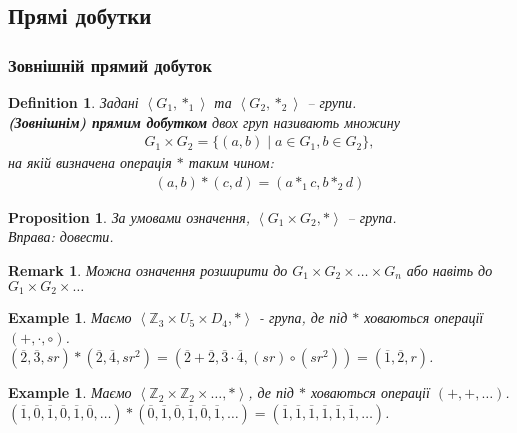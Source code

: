 \documentclass[a4paper, 10pt]{article}
\theoremstyle{theoremdd}
\theoremstyle{theoremdd}
\newtheorem{definition}[theorem]{Definition}
\theoremstyle{theoremdd}
\theoremstyle{theoremdd}
\theoremstyle{theoremdd}
\newtheorem{example}[theorem]{Example}
\theoremstyle{theoremdd}
\theoremstyle{theoremdd}
\theoremstyle{theoremdd}
\theoremstyle{theoremdd}
\newtheorem{proposition}[theorem]{Proposition}
\theoremstyle{theoremdd}
\theoremstyle{theoremdd}
\newtheorem{remark}[theorem]{Remark}
\theoremstyle{theoremdd}
\theoremstyle{theoremdd}
\theoremstyle{theoremdd}
\theoremstyle{theoremdd}
\begin{document}
\subsection{Прямі добутки}
\subsubsection{Зовнішній прямий добуток}
\begin{definition}
Задані $\left<G_1, *_1 \right>$ та $\left<G_2, *_2 \right>$ -- групи.\\
\textbf{(Зовнішнім) прямим добутком} двох груп називають множину
\begin{align*}
G_1 \times G_2 = \{(a,b) \mid a \in G_1, b \in G_2\},
\end{align*}
на якій визначена операція $*$ таким чином:
\begin{align*}
(a,b) * (c,d) = (a *_1 c, b*_2 d)
\end{align*}
\end{definition}

\begin{proposition}
За умовами означення, $\left< G_1 \times G_2, * \right>$ -- група.\\
\textit{Вправа: довести.}
\end{proposition}

\begin{remark}
Можна означення розширити до $G_1 \times G_2 \times \dots \times G_n$ або навіть до $G_1 \times G_2 \times \dots$
\end{remark}

\begin{example}
Маємо $\left< \mathbb{Z}_3 \times U_5 \times D_4, * \right>$ - група, де під $*$ ховаються операції $(+,\cdot,\circ)$.\\
$(\overline{2},\overline{3},sr)*(\overline{2}, \overline{4}, sr^2) = (\overline{2}+\overline{2}, \overline{3} \cdot \overline{4}, (sr) \circ (sr^2)) = (\overline{1},\overline{2}, r)$.
\end{example}

\begin{example}
Маємо $\left< \mathbb{Z}_2 \times \mathbb{Z}_2 \times \dots, * \right>$, де під $*$ ховаються операції $(+,+,\dots)$.\\
$(\overline{1},\overline{0},\overline{1},\overline{0},\overline{1},\overline{0},\dots)*(\overline{0},\overline{1},\overline{0},\overline{1},\overline{0},\overline{1},\dots) = (\overline{1},\overline{1},\overline{1},\overline{1},\overline{1},\overline{1},\dots)$.
\end{example}
\end{document}

